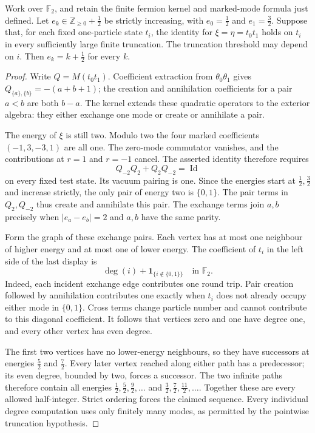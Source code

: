 \begin{proposition}\label{prop:fermion-grading-rigidity}
Work over $\mathbb F_2$, and retain the finite fermion kernel and marked-mode formula just defined. Let $e_k\in\mathbb Z_{\geq0}+\tfrac12$ be strictly increasing, with $e_0=\tfrac12$ and $e_1=\tfrac32$. Suppose that, for each fixed one-particle state $t_i$, the identity for $\xi=\eta=t_0t_1$ holds on $t_i$ in every sufficiently large finite truncation. The truncation threshold may depend on $i$. Then $e_k=k+\tfrac12$ for every $k$.
\end{proposition}
\begin{proof}
Write $Q=M(t_0t_1)$. Coefficient extraction from $\theta_0\theta_1$ gives
$Q_{\{a\},\{b\}}=-(a+b+1)$; the creation and annihilation coefficients for a pair $a<b$ are both $b-a$. The kernel extends these quadratic operators to the exterior algebra: they either exchange one mode or create or annihilate a pair.

The energy of $\xi$ is still two. Modulo two the four marked coefficients $(-1,3,-3,1)$ are all one. The zero-mode commutator vanishes, and the contributions at $r=1$ and $r=-1$ cancel. The asserted identity therefore requires
\[
 Q_{-2}Q_2+Q_2Q_{-2}=\operatorname{Id}
\]
on every fixed test state. Its vacuum pairing is one. Since the energies start at $\tfrac12,\tfrac32$ and increase strictly, the only pair of energy two is $\{0,1\}$. The pair terms in $Q_2,Q_{-2}$ thus create and annihilate this pair. The exchange terms join $a,b$ precisely when $|e_a-e_b|=2$ and $a,b$ have the same parity.

Form the graph of these exchange pairs. Each vertex has at most one neighbour of higher energy and at most one of lower energy. The coefficient of $t_i$ in the left side of the last display is
\[
 \deg(i)+\mathbf1_{\{i\notin\{0,1\}\}}\quad\text{in }\mathbb F_2.
\]
Indeed, each incident exchange edge contributes one round trip. Pair creation followed by annihilation contributes one exactly when $t_i$ does not already occupy either mode in $\{0,1\}$. Cross terms change particle number and cannot contribute to this diagonal coefficient. It follows that vertices zero and one have degree one, and every other vertex has even degree.

The first two vertices have no lower-energy neighbours, so they have successors at energies $\tfrac52$ and $\tfrac72$. Every later vertex reached along either path has a predecessor; its even degree, bounded by two, forces a successor. The two infinite paths therefore contain all energies $\tfrac12,\tfrac52,\tfrac92,\ldots$ and $\tfrac32,\tfrac72,\tfrac{11}2,\ldots$. Together these are every allowed half-integer. Strict ordering forces the claimed sequence. Every individual degree computation uses only finitely many modes, as permitted by the pointwise truncation hypothesis.
\end{proof}

